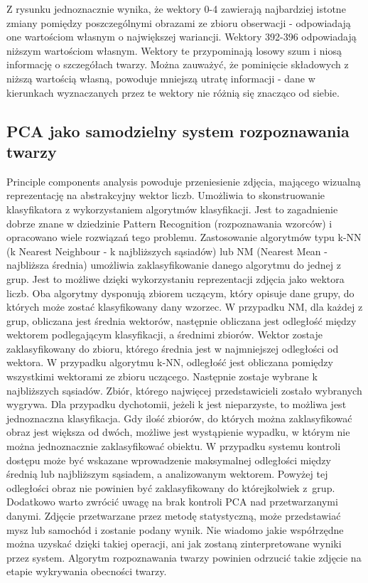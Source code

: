 \documentclass[oneside, eng]{mgr}
\begin{document}
Z rysunku jednoznacznie wynika, że wektory 0-4 zawierają najbardziej istotne zmiany pomiędzy poszczególnymi obrazami ze zbioru obserwacji - odpowiadają one wartościom własnym o największej wariancji. Wektory 392-396 odpowiadają niższym wartościom własnym. Wektory te przypominają losowy szum i niosą informację o szczegółach twarzy. Można zauważyć, że pominięcie składowych z niższą wartością własną, powoduje mniejszą utratę informacji - dane w kierunkach wyznaczanych przez te wektory nie różnią się znacząco od siebie.

\subsection{PCA jako samodzielny system rozpoznawania twarzy}
Principle components analysis powoduje przeniesienie zdjęcia, mającego wizualną reprezentację na abstrakcyjny wektor liczb. Umożliwia to skonstruowanie klasyfikatora z wykorzystaniem algorytmów klasyfikacji. Jest to zagadnienie dobrze znane w dziedzinie Pattern Recognition (rozpoznawania wzorców) i opracowano wiele rozwiązań tego problemu. Zastosowanie algorytmów typu k-NN (k Nearest Neighbour - k najbliższych sąsiadów) lub NM (Nearest Mean - najbliższa średnia) umożliwia zaklasyfikowanie danego algorytmu do jednej z grup. Jest to możliwe dzięki wykorzystaniu reprezentacji zdjęcia jako wektora liczb. Oba algorytmy dysponują zbiorem uczącym, który opisuje dane grupy, do których może zostać klasyfikowany dany wzorzec. 
W przypadku NM, dla każdej z grup, obliczana jest średnia wektorów, następnie obliczana jest odległość między wektorem podlegającym klasyfikacji, a średnimi zbiorów. Wektor zostaje zaklasyfikowany do zbioru, którego średnia jest w najmniejszej odległości od wektora. 
W przypadku algorytmu k-NN, odległość jest obliczana pomiędzy wszystkimi wektorami ze zbioru uczącego. Następnie zostaje wybrane k najbliższych sąsiadów. Zbiór, którego najwięcej przedstawicieli zostało wybranych wygrywa. Dla przypadku dychotomii, jeżeli k jest nieparzyste, to możliwa jest jednoznaczna klasyfikacja. Gdy ilość zbiorów, do których można zaklasyfikować obraz jest większa od dwóch, możliwe jest wystąpienie wypadku, w którym nie można jednoznacznie zaklasyfikować obiektu. 
W przypadku systemu kontroli dostępu może być wskazane wprowadzenie maksymalnej odległości między średnią lub najbliższym sąsiadem, a analizowanym wektorem. Powyżej tej odległości obraz nie powinien być zaklasyfikowany do którejkolwiek z~grup. 
Dodatkowo warto zwrócić uwagę na brak kontroli PCA nad przetwarzanymi danymi. Zdjęcie przetwarzane przez metodę statystyczną, może przedstawiać mysz lub samochód i zostanie podany wynik. Nie wiadomo jakie współrzędne można uzyskać dzięki takiej operacji, ani jak zostaną zinterpretowane wyniki przez system. Algorytm rozpoznawania twarzy powinien odrzucić takie zdjęcie na etapie wykrywania obecności twarzy.
\end{document}
